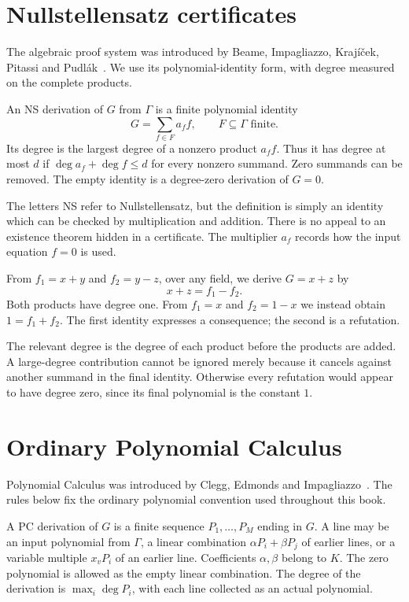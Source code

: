\section{Nullstellensatz certificates}
The algebraic proof system was introduced by Beame, Impagliazzo,
Kraj\'i\v cek, Pitassi and Pudl\'ak~\cite{NSFoundations}. We use its
polynomial-identity form, with degree measured on the complete products.
\begin{definition}[NS consequence]\label{tx:def:NS}
An NS derivation of $G$ from $\Gamma$ is a finite polynomial identity
\begin{equation}\label{tx:eq:NS}
                         G=\sum_{f\in F}a_ff,
                   \qquad F\subseteq\Gamma\text{ finite}.
\end{equation}
Its degree is the largest degree of a nonzero product $a_ff$.
Thus it has degree at most $d$ if
$\deg a_f+\deg f\le d$ for every nonzero summand. Zero summands can be
removed. The empty identity is a degree-zero derivation of $G=0$.
\end{definition}

The letters NS refer to Nullstellensatz, but the definition is simply
an identity which can be checked by multiplication and addition. There
is no appeal to an existence theorem hidden in a certificate. The
multiplier $a_f$ records how the input equation $f=0$ is used.

\begin{example}\label{tx:eg:first-NS}
From $f_1=x+y$ and $f_2=y-z$, over any field, we derive $G=x+z$ by
\[
                       x+z=f_1-f_2.
\]
Both products have degree one. From $f_1=x$ and $f_2=1-x$ we instead
obtain $1=f_1+f_2$. The first identity expresses a consequence; the
second is a refutation.
\end{example}

The relevant degree is the degree of each product before the products
are added. A large-degree contribution cannot be ignored merely because
it cancels against another summand in the final identity. Otherwise
every refutation would appear to have degree zero, since its final
polynomial is the constant $1$.

\section{Ordinary Polynomial Calculus}
Polynomial Calculus was introduced by Clegg, Edmonds and
Impagliazzo~\cite{PCFoundations}. The rules below fix the ordinary
polynomial convention used throughout this book.
\begin{definition}\label{tx:def:PC}
A PC derivation of $G$ is a finite sequence $P_1,\ldots,P_M$ ending in
$G$. A line may be an input polynomial from $\Gamma$, a linear
combination $\alpha P_i+\beta P_j$ of earlier lines, or a variable
multiple $x_vP_i$ of an earlier line. Coefficients $\alpha,\beta$ belong
to $K$. The zero polynomial is allowed as the empty linear combination.
The degree of the derivation is $\max_i\deg P_i$, with each line
collected as an actual polynomial.
\end{definition}

